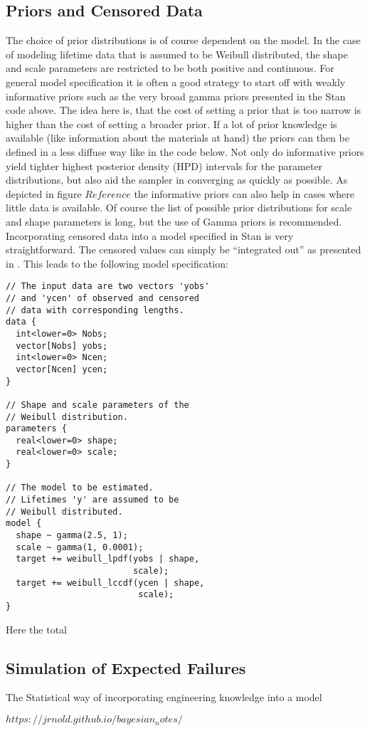 \subsection{Priors and Censored Data}
The choice of prior distributions is of course dependent on the model. In the case of modeling lifetime data that is assumed to be Weibull distributed, the shape and scale parameters are restricted to be both positive and continuous. For general model specification it is often a good strategy to start off with weakly informative priors such as the very broad gamma priors presented in the Stan code above. The idea here is, that the cost of setting a prior that is too narrow is higher than the cost of setting a broader prior. If a lot of prior knowledge is available (like information about the materials at hand) the priors can then be defined in a less diffuse way like in the code below. Not only do informative priors yield tighter highest posterior density (HPD) intervals for the parameter distributions, but also aid the sampler in converging as quickly as possible. As depicted in figure $Reference$ the informative priors can also help in cases where little data is available. Of course the list of possible prior distributions for scale and shape parameters is long, but the use of Gamma priors is recommended. \cite{gammaprior} \\
Incorporating censored data into a model specified in Stan is very straightforward. The censored values can simply be ``integrated out'' as presented in \cite{censoreddatastan}. This leads to the following model specification: 
\begin{verbatim}
// The input data are two vectors 'yobs'
// and 'ycen' of observed and censored 
// data with corresponding lengths. 
data {
  int<lower=0> Nobs;
  vector[Nobs] yobs;
  int<lower=0> Ncen;
  vector[Ncen] ycen;
}

// Shape and scale parameters of the
// Weibull distribution.
parameters {
  real<lower=0> shape;
  real<lower=0> scale;
}

// The model to be estimated. 
// Lifetimes 'y' are assumed to be
// Weibull distributed. 
model {
  shape ~ gamma(2.5, 1);
  scale ~ gamma(1, 0.0001);
  target += weibull_lpdf(yobs | shape, 
                         scale);
  target += weibull_lccdf(ycen | shape, 
                          scale);
}
\end{verbatim}
Here the total 

\subsection{Simulation of Expected Failures}

The Statistical way of incorporating engineering knowledge into a model 

$https://jrnold.github.io/bayesian_notes/$
